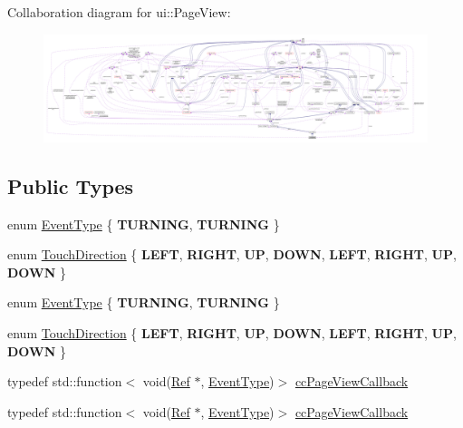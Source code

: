 Collaboration diagram for ui\+:\+:Page\+View\+:
\nopagebreak
\begin{figure}[H]
\begin{center}
\leavevmode
\includegraphics[width=350pt]{classui_1_1PageView__coll__graph}
\end{center}
\end{figure}
\subsection*{Public Types}
\begin{DoxyCompactItemize}
\item 
enum \hyperlink{classui_1_1PageView_aeedcbcc6dcac6fc377ef09132b3ae495}{Event\+Type} \{ {\bfseries T\+U\+R\+N\+I\+NG}, 
{\bfseries T\+U\+R\+N\+I\+NG}
 \}
\item 
enum \hyperlink{classui_1_1PageView_a95b0e3ff5da243df2a7dfc1c05d7017c}{Touch\+Direction} \{ \newline
{\bfseries L\+E\+FT}, 
{\bfseries R\+I\+G\+HT}, 
{\bfseries UP}, 
{\bfseries D\+O\+WN}, 
\newline
{\bfseries L\+E\+FT}, 
{\bfseries R\+I\+G\+HT}, 
{\bfseries UP}, 
{\bfseries D\+O\+WN}
 \}
\item 
enum \hyperlink{classui_1_1PageView_aeedcbcc6dcac6fc377ef09132b3ae495}{Event\+Type} \{ {\bfseries T\+U\+R\+N\+I\+NG}, 
{\bfseries T\+U\+R\+N\+I\+NG}
 \}
\item 
enum \hyperlink{classui_1_1PageView_a95b0e3ff5da243df2a7dfc1c05d7017c}{Touch\+Direction} \{ \newline
{\bfseries L\+E\+FT}, 
{\bfseries R\+I\+G\+HT}, 
{\bfseries UP}, 
{\bfseries D\+O\+WN}, 
\newline
{\bfseries L\+E\+FT}, 
{\bfseries R\+I\+G\+HT}, 
{\bfseries UP}, 
{\bfseries D\+O\+WN}
 \}
\item 
typedef std\+::function$<$ void(\hyperlink{classRef}{Ref} $\ast$, \hyperlink{classui_1_1ListView_a7ef851492220e4bccadbaf16d95d26b9}{Event\+Type})$>$ \hyperlink{classui_1_1PageView_a1cbaf2e41005380574beae96ac2bc136}{cc\+Page\+View\+Callback}
\item 
typedef std\+::function$<$ void(\hyperlink{classRef}{Ref} $\ast$, \hyperlink{classui_1_1ListView_a7ef851492220e4bccadbaf16d95d26b9}{Event\+Type})$>$ \hyperlink{classui_1_1PageView_a1cbaf2e41005380574beae96ac2bc136}{cc\+Page\+View\+Callback}
\end{DoxyCompactItemize}
